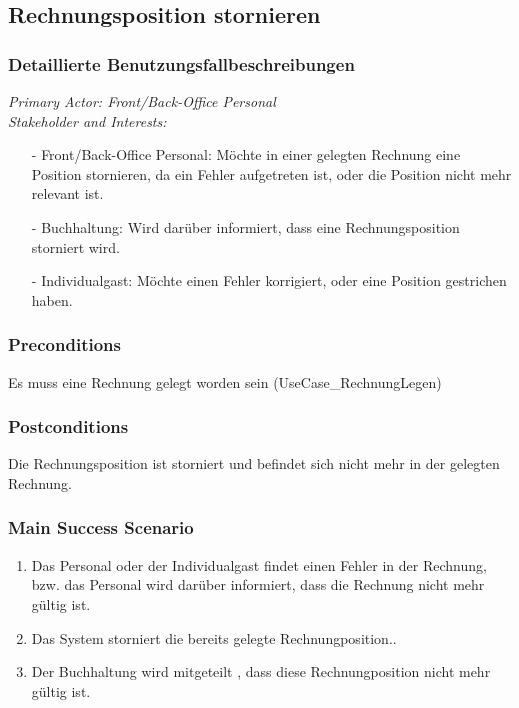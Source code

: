 \documentclass[./detailed_overview_usecases.tex]{subfiles}
\begin{document}
    \subsection{Rechnungsposition stornieren}
    \subsubsection{Detaillierte Benutzungsfallbeschreibungen}
    \textit{Primary Actor: Front/Back-Office Personal}
    \\
    \textit{Stakeholder and Interests:}
    \begin{itemize}
        \item[-] Front/Back-Office Personal: Möchte in einer gelegten Rechnung eine Position stornieren, da ein Fehler aufgetreten ist, oder die Position nicht mehr relevant ist.
        \item[-] Buchhaltung: Wird darüber informiert, dass eine Rechnungsposition storniert wird.
        \item[-] Individualgast: Möchte einen Fehler korrigiert, oder eine Position gestrichen haben.
    \end{itemize}

    \subsubsection*{Preconditions}
    Es muss eine Rechnung gelegt worden sein (UseCase_RechnungLegen)

    \subsubsection*{Postconditions}
    Die Rechnungsposition ist storniert und befindet sich nicht mehr in der gelegten Rechnung.

    \subsubsection*{Main Success Scenario}
    \begin{enumerate}
        \item Das Personal oder der Individualgast findet einen Fehler in der Rechnung, bzw. das Personal wird darüber informiert, dass die Rechnung nicht mehr gültig ist.
        \item Das System storniert die bereits gelegte Rechnungposition..
        \item Der Buchhaltung wird mitgeteilt , dass diese Rechnungposition nicht mehr gültig ist.
    \end{enumerate}
\end{document}
